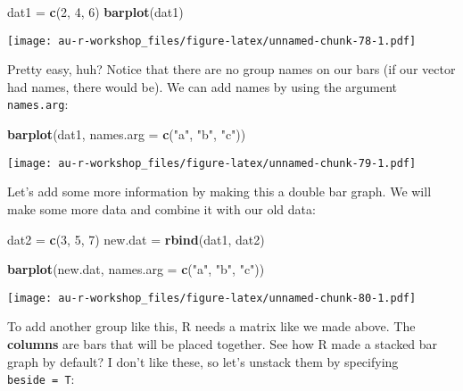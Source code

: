 \documentclass[]{book}
\newenvironment{Shaded}{\begin{snugshade}}{\end{snugshade}}
\newcommand{\KeywordTok}[1]{\textcolor[rgb]{0.13,0.29,0.53}{\textbf{#1}}}
\newcommand{\DataTypeTok}[1]{\textcolor[rgb]{0.13,0.29,0.53}{#1}}
\newcommand{\DecValTok}[1]{\textcolor[rgb]{0.00,0.00,0.81}{#1}}
\newcommand{\StringTok}[1]{\textcolor[rgb]{0.31,0.60,0.02}{#1}}
\newcommand{\NormalTok}[1]{#1}
\theoremstyle{definition}
\theoremstyle{definition}
\theoremstyle{definition}
\theoremstyle{remark}
\begin{document}
\begin{Shaded}
\begin{Highlighting}[]
\NormalTok{dat1 =}\StringTok{ }\KeywordTok{c}\NormalTok{(}\DecValTok{2}\NormalTok{, }\DecValTok{4}\NormalTok{, }\DecValTok{6}\NormalTok{)}
\KeywordTok{barplot}\NormalTok{(dat1)}
\end{Highlighting}
\end{Shaded}

\texttt{[image: au-r-workshop\_files/figure-latex/unnamed-chunk-78-1.pdf]}

Pretty easy, huh? Notice that there are no group names on our bars (if
our vector had names, there would be). We can add names by using the
argument \texttt{names.arg}:

\begin{Shaded}
\begin{Highlighting}[]
\KeywordTok{barplot}\NormalTok{(dat1, }\DataTypeTok{names.arg =} \KeywordTok{c}\NormalTok{(}\StringTok{"a"}\NormalTok{, }\StringTok{"b"}\NormalTok{, }\StringTok{"c"}\NormalTok{))}
\end{Highlighting}
\end{Shaded}

\texttt{[image: au-r-workshop\_files/figure-latex/unnamed-chunk-79-1.pdf]}

Let's add some more information by making this a double bar graph. We
will make some more data and combine it with our old data:

\begin{Shaded}
\begin{Highlighting}[]
\NormalTok{dat2 =}\StringTok{ }\KeywordTok{c}\NormalTok{(}\DecValTok{3}\NormalTok{, }\DecValTok{5}\NormalTok{, }\DecValTok{7}\NormalTok{)}
\NormalTok{new.dat =}\StringTok{ }\KeywordTok{rbind}\NormalTok{(dat1, dat2)}

\KeywordTok{barplot}\NormalTok{(new.dat, }\DataTypeTok{names.arg =} \KeywordTok{c}\NormalTok{(}\StringTok{"a"}\NormalTok{, }\StringTok{"b"}\NormalTok{, }\StringTok{"c"}\NormalTok{))}
\end{Highlighting}
\end{Shaded}

\texttt{[image: au-r-workshop\_files/figure-latex/unnamed-chunk-80-1.pdf]}

To add another group like this, R needs a matrix like we made above. The
\textbf{columns} are bars that will be placed together. See how R made a
stacked bar graph by default? I don't like these, so let's unstack them
by specifying \texttt{beside\ =\ T}:
\end{document}
